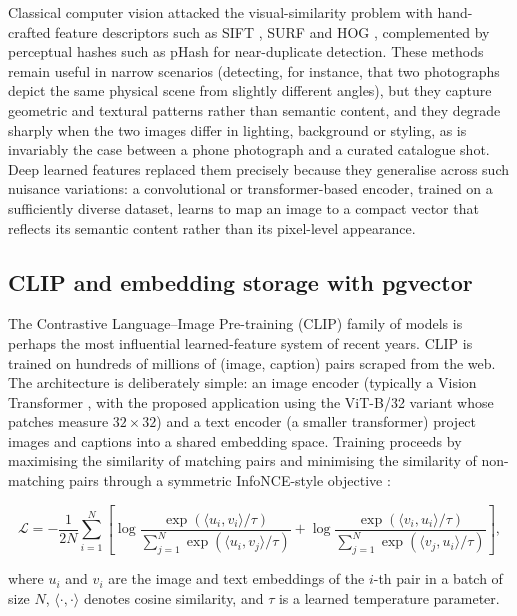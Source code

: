 Classical computer vision attacked the visual-similarity problem with hand-crafted feature descriptors such as SIFT \cite{lowe2004sift}, SURF \cite{bay2008surf} and HOG \cite{dalal2005hog}, complemented by perceptual hashes such as pHash \cite{zauner2010phash} for near-duplicate detection. These methods remain useful in narrow scenarios (detecting, for instance, that two photographs depict the same physical scene from slightly different angles), but they capture geometric and textural patterns rather than semantic content, and they degrade sharply when the two images differ in lighting, background or styling, as is invariably the case between a phone photograph and a curated catalogue shot. Deep learned features replaced them precisely because they generalise across such nuisance variations: a convolutional or transformer-based encoder, trained on a sufficiently diverse dataset, learns to map an image to a compact vector that reflects its semantic content rather than its pixel-level appearance.

\subsection{CLIP and embedding storage with pgvector}

The Contrastive Language--Image Pre-training (CLIP) family of models \cite{radford2021clip} is perhaps the most influential learned-feature system of recent years. CLIP is trained on hundreds of millions of (image, caption) pairs scraped from the web. The architecture is deliberately simple: an image encoder (typically a Vision Transformer \cite{dosovitskiy2020vit}, with the proposed application using the ViT-B/32 variant whose patches measure $32\times32$) and a text encoder (a smaller transformer) project images and captions into a shared embedding space. Training proceeds by maximising the similarity of matching pairs and minimising the similarity of non-matching pairs through a symmetric InfoNCE-style objective \cite{oord2018infonce}:

\begin{equation}
\mathcal{L} = -\frac{1}{2N} \sum_{i=1}^{N} \left[ \log \frac{\exp(\langle u_i, v_i \rangle / \tau)}{\sum_{j=1}^{N} \exp(\langle u_i, v_j \rangle / \tau)} + \log \frac{\exp(\langle v_i, u_i \rangle / \tau)}{\sum_{j=1}^{N} \exp(\langle v_j, u_i \rangle / \tau)} \right],
\label{eq:clip-loss}
\end{equation}

where \(u_i\) and \(v_i\) are the image and text embeddings of the \(i\)-th pair in a batch of size \(N\), \(\langle \cdot, \cdot \rangle\) denotes cosine similarity, and \(\tau\) is a learned temperature parameter.

